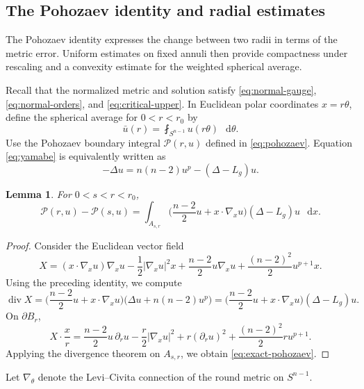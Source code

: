 \documentclass[11pt]{article}
\numberwithin{equation}{section}
\newtheorem{lemma}[theorem]{Lemma}
\theoremstyle{remark}
\newcommand{\Sph}{S}
\newcommand{\cP}{\mathcal P}
\newcommand{\pa}{\partial}
\newcommand{\dd}{\mathop{}\!\mathrm{d}}
\begin{document}
\subsection{The Pohozaev identity and radial estimates}

{
The Pohozaev identity expresses the change between two radii in terms of the
metric error.  Uniform estimates on fixed annuli then provide compactness
under rescaling and a convexity estimate for the weighted spherical average.
}

Recall that the normalized metric and solution satisfy
\eqref{eq:normal-gauge}, \eqref{eq:normal-orders}, and
\eqref{eq:critical-upper}. In Euclidean polar coordinates \(x=r\theta\),
define the spherical average for \(0<r<r_0\) by
\begin{equation}\label{eq:spherical-average}
 \bar u(r)=\fint_{\Sph^{n-1}}u(r\theta)\,\dd\theta.
\end{equation}
Use the Pohozaev boundary integral \(\cP(r,u)\) defined in
\eqref{eq:pohozaev}.
{
Equation  \eqref{eq:yamabe} is equivalently written as
\[
 -\Delta u=n(n-2)u^p-(\Delta-L_g)u.
\]
}

\par
\begin{lemma}\label{lem:exact-pohozaev}
For \(0<s<r<r_0\),
\begin{equation}\label{eq:exact-pohozaev}
 \cP(r,u)-\cP(s,u)
 =
 \int_{A_{s,r}}
 \bigl(\frac{n-2}{2}u+x\cdot\nabla_xu\bigr)(\Delta-L_g)u\,\dd x .
\end{equation}
\end{lemma}

\par
\begin{proof}
Consider the Euclidean vector field
\[
 X=(x\cdot\nabla_xu)\nabla_xu-\frac12|\nabla_xu|^2x
   +\frac{n-2}{2}u\nabla_xu+\frac{(n-2)^2}{2}u^{p+1}x.
\]
{Using the preceding identity, we compute}
\[
 \operatorname{div}X
 =
 \bigl(\frac{n-2}{2}u+x\cdot\nabla_xu\bigr)
 \bigl(\Delta u+n(n-2)u^p\bigr)
 =\bigl(\frac{n-2}{2}u+x\cdot\nabla_xu\bigr)(\Delta-L_g)u.
\]
{On \(\partial B_r\),}
\[
 X\cdot\frac{x}{r}
 =
 \frac{n-2}{2}u\,\pa_r u-\frac r2|\nabla_xu|^2+r(\pa_r u)^2
 +\frac{(n-2)^2}{2}r u^{p+1}.
\]
{Applying the divergence theorem on \(A_{s,r}\), we obtain
\eqref{eq:exact-pohozaev}.}
\end{proof}

\par
Let \(\nabla_\theta\) denote the Levi--Civita connection of the round
metric on \(\Sph^{n-1}\).
\end{document}
